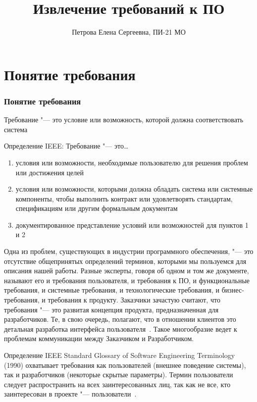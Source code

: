 \documentclass{../industrial-development}
\title{Извлечение требований к ПО}
\author{Петрова Елена Сергеевна, ПИ-21 МО}
\date{}
\begin{document}
\begin{frame}
  \titlepage
\end{frame}

\section{Понятие требования}
\begin{frame} \frametitle{Понятие требования}
  \begin{block}{}
   \alert{Требование} "--- это условие или возможность, которой должна соответствовать система
  \end{block}
  Определение IEEE:  \alert{Требование} "--- это\dots
	 \begin{enumerate}
\item условия или возможности, необходимые пользователю для решения проблем или достижения целей
\item условия или возможности, которыми должна обладать система или системные компоненты, чтобы выполнить контракт или
удовлетворять стандартам, спецификациям или другим формальным документам
\item документированное представление условий или возможностей для пунктов 1 и 2
  \end{enumerate}
\end{frame}

\lecturenotes

Одна из проблем, существующих в индустрии программного обеспечения, "--- это отсутствие общепринятых определений терминов, которыми мы пользуемся для описания нашей работы. Разные эксперты, говоря об одном и том же документе, называют его и требования пользователя, и требования к ПО, и функциональные требования, и системные требования, и технологические требования, и бизнес-требования, и требования к продукту. Заказчики зачастую считают, что требования "--- это развитая концепция продукта, предназначенная для
разработчиков. Те, в свою очередь, полагают, что в отношении клиентов это детальная разработка интерфейса пользователя~\cite[с.~6]{Wiegers}. Такое многообразие ведет к проблемам коммуникации между Заказчиком и Разработчиком.

Определение IEEE Standard Glossary
of Software Engineering Terminology (1990) охватывает требования как пользователей (внешнее поведение системы), так и разработчиков (некоторые скрытые параметры). Термин пользователи следует распространить на всех заинтересованных лиц, так как не все, кто заинтересован в проекте "--- пользователи~\cite[с.~7]{Wiegers}. 
\end{document}
